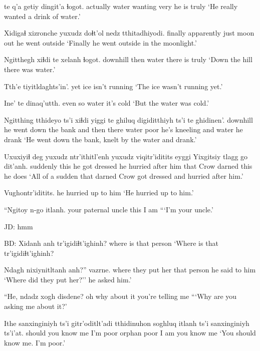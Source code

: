 \documentclass[12pt]{article}
\begin{document}
 te q'a getiy dingit'a ɬogot.
actually           water wanting very {he is} truly
\glt `He really wanted a drink of water.'
\glend

\gll Xidigaɬ xizronche yuxudz doɬt'ol nedz tthitadhiyodi.
finally apparently just    moon    out  {he went outside}
\glt `Finally he went outside in the moonlight.'
\glend

\gll Ngitthegh xiɬdi te    xelanh ɬogot.
downhill  then  water {there is} truly
\glt `Down the hill there was water.'
\glend

\gll Tth'e {tiyitldaghts'in'. }
yet   {ice isn't running}
\glt `The ice wasn't running yet.'
\glend

\gll Ine'    te    dinaq'utth.
{even so} water {it's cold}
\glt `But the water was cold.'
\glend

\gll Ngitthing tthideyo      ts'i xiɬdi yiggi te ghiluq digiditthiyh ts'i te ghidinen'.
downhill  {he went down the bank} and then  there water poor {he's kneeling} and water {he drank}
\glt `He went down the bank, knelt by the water and drank.'
\glend

\gll Uxuxiyiɬ {deg yuxudz} ntr'ithitl'enh yuxudz viqitr'iditits     eyggi Yixgitsiy tlagg  go dit'anh.
suddenly this       {he got dressed} {}     {he hurried after him} that  Crow  darned this {he does}
\glt `All of a sudden that darned Crow got dressed and hurried after him.'
\glend

\gll Vughontr'iditits.
{{he hurried up to him}}
\glt `He hurried up to him.'
\glend

\gll ``Ngitoy     n-go itlanh. 
{your paternal uncle} this {I am}
\glt ```I'm your uncle.'
\glend

JD:  hmm

BD:  
\gll Xidanh   anh tr'igidiɬt'ighinh? 
{where is} {that person} {}               
\glt `Where is that tr'igidiɬt'ighinh? 
\glend

\gll Ndagh nixiynitltanh anh?'' vazrne.
where {they put her}  {that person} {he said to him}
\glt `Where did they put her?'' he asked him.'
\glend

\gll ``He,     ndadz xogh     disdene? 
oh  why   {about it} {you're telling me}
\glt ```Why are you asking me about it?'
\glend

\gll Ithe   sanxinginiyh ts'i gitr'oditlt'adi tthidinuhon soghluq itlanh ts'i sanxinginiyh ts'i'at. 
should {you know me} {}  {I'm poor}      orphan poor   {I am} {}   {you know me}
\glt `You should know me. I'm poor.'
\glend
\end{document}
